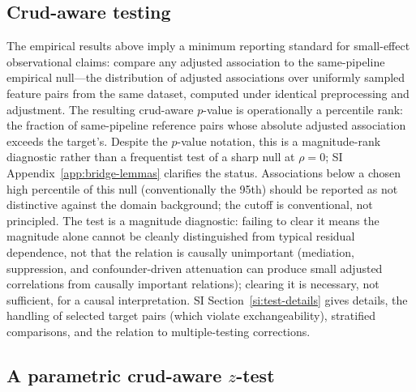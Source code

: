 \subsection{Crud-aware testing}

The empirical results above imply a minimum reporting standard for small-effect observational claims: compare any adjusted association to the same-pipeline empirical null---the distribution of adjusted associations over uniformly sampled feature pairs from the same dataset, computed under identical preprocessing and adjustment. The resulting crud-aware $p$-value is operationally a percentile rank: the fraction of same-pipeline reference pairs whose absolute adjusted association exceeds the target's. Despite the $p$-value notation, this is a magnitude-rank diagnostic rather than a frequentist test of a sharp null at $\rho=0$; SI Appendix~\ref{app:bridge-lemmas} clarifies the status. Associations below a chosen high percentile of this null (conventionally the 95th) should be reported as not distinctive against the domain background; the cutoff is conventional, not principled. The test is a magnitude diagnostic: failing to clear it means the magnitude alone cannot be cleanly distinguished from typical residual dependence, not that the relation is causally unimportant (mediation, suppression, and confounder-driven attenuation can produce small adjusted correlations from causally important relations); clearing it is necessary, not sufficient, for a causal interpretation. SI Section~\ref{si:test-details} gives details, the handling of selected target pairs (which violate exchangeability), stratified comparisons, and the relation to multiple-testing corrections.

\subsection{A parametric crud-aware \texorpdfstring{$z$}{z}-test}


